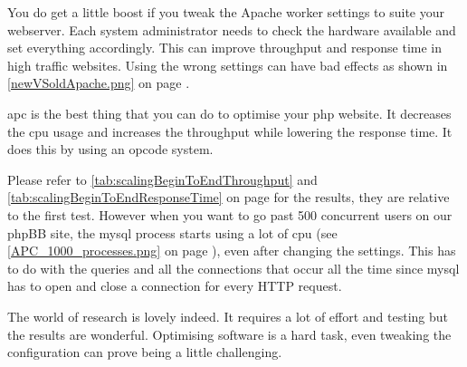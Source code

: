 You do get a little boost if you tweak the Apache worker settings to suite your webserver. Each system administrator needs to check the hardware available and set everything accordingly.
This can improve throughput and response time in high traffic websites. Using the wrong settings can have bad effects as shown in  \autoref{newVSoldApache.png} on page \pageref{newVSoldApache.png}.

\gls{apc} is the best thing that you can do to optimise your \gls{php} website. It decreases the \gls{cpu} usage and increases the throughput while lowering the response time. It does this by using an opcode system. 

Please refer to  \autoref{tab:scalingBeginToEndThroughput} and \autoref{tab:scalingBeginToEndResponseTime} on page \pageref{tab:scalingBeginToEndResponseTime} for the results, they are relative to the first test. 
However when you want to go past 500 concurrent users on our phpBB site, the \gls{mysql} process starts using a lot of \gls{cpu} (see \autoref{APC_1000_processes.png} on page \pageref{APC_1000_processes.png}), even after changing the settings. 
This has to do with the queries and all the connections that occur all the time since \gls{mysql} has to open and close a connection for every HTTP request.

The world of research is lovely indeed. It requires a lot of effort and testing but the results are wonderful. Optimising software is a hard task, even tweaking the configuration can prove being a little challenging. 
\clearpage{}
\listoffigures{}
\clearpage{}
\listoftables{}
\clearpage{}

%


%



\printindex{}

